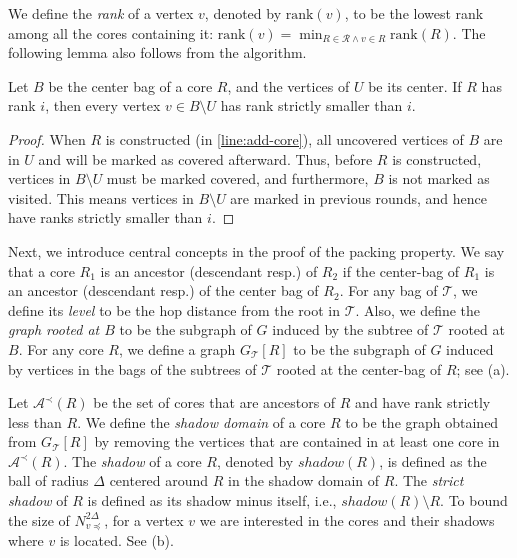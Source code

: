 \documentclass{article}
\newcommand{\mt}{\mathcal{T}}
\newcommand{\rank}{\mathrm{rank}}
\def\coreSet{\mathcal{R}}
\def\core{R}
\def\shadow{shadow}
\begin{document}
We define the \emph{rank} of a vertex $v$, denoted by $\rank(v)$, to be the lowest rank among all the cores containing it: $\rank(v) = \min_{\core\in \coreSet \wedge  v\in \core}\rank(\core)$.  The following lemma also follows from the algorithm.
\begin{lemma}
	\label{lem:noncentervertices}Let $B$ be the center bag of a core $\core$, and the vertices of $U$ be its center. If $\core$ has rank $i$, then every vertex $v\in B\setminus U$ has rank strictly smaller than $i$. 
\end{lemma}
\begin{proof}
	When $\core$ is constructed (in \cref{line:add-core}), all uncovered vertices of $B$ are in $U$ and will be marked as covered afterward. Thus, before $\core$ is constructed, vertices in $B\setminus U$ must be marked covered, and furthermore, $B$ is not marked as visited. This means vertices in $B\setminus U$ are marked in previous rounds, and hence have ranks strictly smaller than $i$. 
\end{proof}

 Next, we introduce central concepts in the proof of the packing property. We say that a core $\core_1$ is an ancestor (descendant resp.) of $\core_2$ if the center-bag of $\core_1$ is an ancestor (descendant resp.) of the center bag of $\core_2$. For any bag of $\mathcal{T}$, we define its \emph{level} to be the hop distance from the root in $\mathcal{T}$. Also, we define the \emph{graph rooted at $B$} to be the subgraph of $G$ induced by the subtree of $\mathcal{T}$ rooted at $B$. For any core $\core$, we define a graph $G_{\mt}[\core]$ to be the subgraph of $G$ induced by vertices in the bags of the subtrees of $\mt$ rooted at the center-bag of $\core$; see (a). 

Let $\mathcal{A}^{\prec}(\core)$ be the set of cores that are ancestors of $\core$ and have rank strictly less than $\core$. We define the \emph{shadow domain} of a core $\core$ to be the graph obtained from $G_{\mt}[\core]$ by removing the vertices that are contained in at least one core in $\mathcal{A}^{\prec}(\core)$. The \emph{shadow} of a core $\core$, denoted by  $\shadow({\core})$, is defined as the ball of radius $\Delta$ centered around $\core$ in the shadow domain of $\core$. The \emph{strict shadow} of $\core$ is defined as its shadow minus itself, i.e., $\shadow({\core}) \setminus \core$. To bound the size of $N_{v\preceq}^{2\Delta}$, for a vertex $v$ we are interested in the cores and their shadows where $v$ is located. See (b). 
\end{document}
